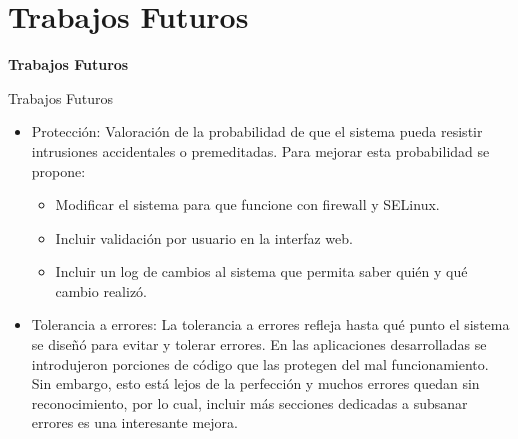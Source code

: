 \section{Trabajos Futuros}
\begin{frame}
    \Huge
    \centering
    \textbf{Trabajos Futuros}

\end{frame}

\begin{frame}{Trabajos Futuros}
    \vspace{0cm}
    \begin{itemize}
        \item Protección: Valoración de la probabilidad de que el sistema pueda resistir intrusiones accidentales o premeditadas. Para mejorar esta probabilidad se propone:
        \begin{itemize}
            \item  Modificar el sistema para que funcione con firewall y SELinux.

            \item  Incluir validación por usuario en la interfaz web. 

            \item  Incluir un log de cambios al sistema que permita saber quién y qué cambio realizó.
        \end{itemize}
        \item Tolerancia a errores: La tolerancia a errores refleja hasta qué punto el sistema se diseñó para evitar y tolerar errores. En las aplicaciones desarrolladas se introdujeron porciones de código que las protegen del mal funcionamiento. Sin embargo, esto está lejos de la perfección y muchos errores quedan sin reconocimiento, por lo cual, incluir más secciones dedicadas a subsanar errores es una interesante mejora.
    \end{itemize}

\end{frame}


